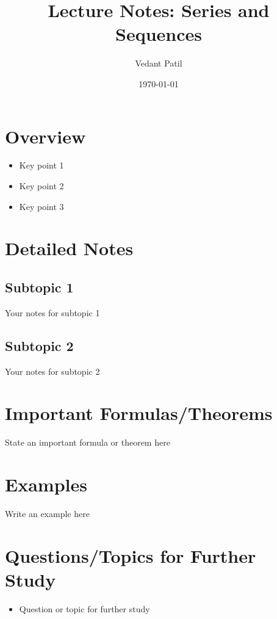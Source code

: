 \documentclass[12pt,a4paper]{article}
\title{Lecture Notes: Series and Sequences}
\author{Vedant Patil }
\date{\today}
\begin{document}
\maketitle

\section{Overview}
\begin{tcolorbox}[colback=yellow!10!white,colframe=yellow!50!black,title=Key Points]
  \begin{itemize}
    \item Key point 1
    \item Key point 2
    \item Key point 3
  \end{itemize}
\end{tcolorbox}

\section{Detailed Notes}
\subsection{Subtopic 1}
Your notes for subtopic 1

\subsection{Subtopic 2}
Your notes for subtopic 2

\section{Important Formulas/Theorems}
\begin{tcolorbox}[colback=blue!5!white,colframe=blue!75!black,title=Key Formula/Theorem]
  State an important formula or theorem here
\end{tcolorbox}

\section{Examples}
\begin{example}
  Write an example here
\end{example}

\section{Questions/Topics for Further Study}
\begin{itemize}
  \item Question or topic for further study
\end{itemize}
\end{document}
